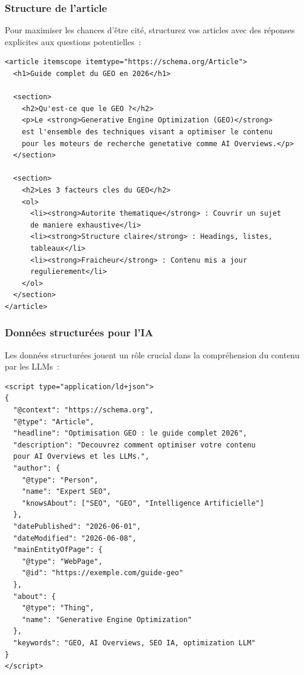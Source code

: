 \documentclass[12pt,a4paper,twoside]{report}
\begin{document}
\subsubsection{Structure de l'article}

Pour maximiser les chances d'être cité, structurez vos articles avec des réponses explicites aux questions potentielles~:

\begin{lstlisting}[style=htmlcode,caption={Structure HTML optimisée pour AI Overviews}]
<article itemscope itemtype="https://schema.org/Article">
  <h1>Guide complet du GEO en 2026</h1>
  
  <section>
    <h2>Qu'est-ce que le GEO ?</h2>
    <p>Le <strong>Generative Engine Optimization (GEO)</strong> 
    est l'ensemble des techniques visant a optimiser le contenu 
    pour les moteurs de recherche genetative comme AI Overviews.</p>
  </section>
  
  <section>
    <h2>Les 3 facteurs cles du GEO</h2>
    <ol>
      <li><strong>Autorite thematique</strong> : Couvrir un sujet 
      de maniere exhaustive</li>
      <li><strong>Structure claire</strong> : Headings, listes, 
      tableaux</li>
      <li><strong>Fraicheur</strong> : Contenu mis a jour 
      regulierement</li>
    </ol>
  </section>
</article>
\end{lstlisting}

\subsubsection{Données structurées pour l'IA}

Les données structurées jouent un rôle crucial dans la compréhension du contenu par les LLMs~:

\begin{lstlisting}[style=htmlcode,caption={Schema.org Article optimisé pour les LLMs}]
<script type="application/ld+json">
{
  "@context": "https://schema.org",
  "@type": "Article",
  "headline": "Optimisation GEO : le guide complet 2026",
  "description": "Decouvrez comment optimiser votre contenu 
  pour AI Overviews et les LLMs.",
  "author": {
    "@type": "Person",
    "name": "Expert SEO",
    "knowsAbout": ["SEO", "GEO", "Intelligence Artificielle"]
  },
  "datePublished": "2026-06-01",
  "dateModified": "2026-06-08",
  "mainEntityOfPage": {
    "@type": "WebPage",
    "@id": "https://exemple.com/guide-geo"
  },
  "about": {
    "@type": "Thing",
    "name": "Generative Engine Optimization"
  },
  "keywords": "GEO, AI Overviews, SEO IA, optimization LLM"
}
</script>
\end{lstlisting}
\end{document}
